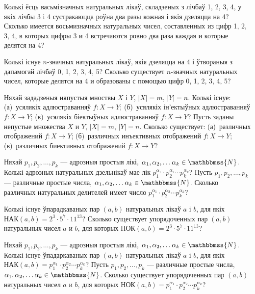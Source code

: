 \begin{problemList}
\problemItemSimple
{Колькі ёсць васьмізначных натуральных лікаў, складзеных з лічбаў 1, 2, 3, 4, у якіх лічбы 3 і 4 сустракаюцца роўна два разы кожная і якія дзеляцца на 4?}
{Сколько имеется восьмизначных натуральных чисел, составленных из цифр 1, 2, 3, 4, в которых цифры 3 и 4 встречаются ровно два раза каждая и которые делятся на 4?}

\problemItemSimple
{Колькі існуе $n$-значных натуральных лікаў, якія дзеляцца на 4 і ўтвораныя з дапамогай лічбаў 0, 1, 2, 3, 4, 5?}
{Сколько существует $n$-значных натуральных чисел, которые делятся на 4 и образованы с помощью цифр 0, 1, 2, 3, 4, 5?} 

\problemItemSimple
{Няхай зададзеныя няпустыя мноствы $X$ і $Y$, $|X|=m$, $|Y|=n$. Колькі існуе: (а)~усялякіх адлюстраванняў $f : X \rightarrow Y$; (б)~усялякіх ін'ектыўных адлюстраванняў $f : X \rightarrow Y$; (в)~усялякіх біектыўных адлюстраванняў $f : X \rightarrow Y$?}
{Пусть заданы непустые множества $X$ и $Y$, $|X|=m$, $|Y|=n$. Сколько существует: (а)~различных отображений $f : X \rightarrow Y$; (б)~различных инъективных отображений $f : X \rightarrow Y$; (в)~различных биективных отображений $f : X \rightarrow Y$?}

\problemItemSimple
{Няхай $p_{1}, p_{2}, \dots, p_{k}$ --- адрозныя простыя лікі, $\alpha_{1}, \alpha_{2}, \dots \alpha_{k} \in \mathbbmss{N}$. Колькі адрозных натуральных дзельнікаў мае лік $p_{1} ^{\alpha_{1}} \cdot p_{2} ^{\alpha_{2}} \cdots p_{k} ^{\alpha_{k}}$?}
{Пусть $p_{1}, p_{2}, \dots, p_{k}$ --- различные простые числа, $\alpha_{1}, \alpha_{2}, \dots \alpha_{k} \in \mathbbmss{N}$. Сколько различных натуральных делителей имеет число $p_{1} ^{\alpha_{1}} \cdot p_{2} ^{\alpha_{2}} \cdots p_{k} ^{\alpha_{k}}$?}

\problemItemSimple
{Колькі існуе ўпарадкаваных пар $(a,b)$ натуральных лікаў $a$ і $b$, для якіх $\text{НАК}(a,b) = 2^{3} \cdot 5^{7}\cdot 11^{13}$?}
{Сколько существует упорядоченных пар $(a,b)$ натуральных чисел $a$ и $b$, для которых $\text{НОК}(a,b) = 2^{3} \cdot 5^{7}\cdot 11^{13}$?}

\problemItemSimple
{Няхай $p_{1}, p_{2}, \dots, p_{k}$ --- адрозныя простыя лікі, $\alpha_{1}, \alpha_{2}, \dots \alpha_{k} \in \mathbbmss{N}$. Колькі існуе ўпадаркаваных пар $(a,b)$  натуральных лікаў $a$ і $b$, для якіх $\text{НАК}(a,b) = p_{1} ^{\alpha_{1}} \cdot p_{2} ^{\alpha_{2}} \cdots p_{k} ^{\alpha_{k}}$?}
{Пусть $p_{1}, p_{2}, \dots, p_{k}$ --- различные простые числа, $\alpha_{1}, \alpha_{2}, \dots \alpha_{k} \in \mathbbmss{N}$. Сколько существует упорядоченных пар $(a,b)$ натуральных чисел $a$ и $b$, для которых $\text{НОК}(a,b) = p_{1} ^{\alpha_{1}} \cdot p_{2} ^{\alpha_{2}} \cdots p_{k} ^{\alpha_{k}}$?}


\end{problemList}
